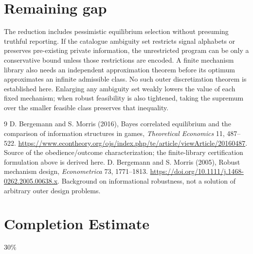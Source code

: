 \documentclass[11pt]{article}
\theoremstyle{definition}
\theoremstyle{remark}
\begin{document}
\section{Remaining gap}
The reduction includes pessimistic equilibrium selection without presuming truthful reporting. If the catalogue ambiguity set restricts signal alphabets or preserves pre-existing private information, the unrestricted program can be only a conservative bound unless those restrictions are encoded. A finite mechanism library also needs an independent approximation theorem before its optimum approximates an infinite admissible class. No such outer discretization theorem is established here. Enlarging any ambiguity set weakly lowers the value of each fixed mechanism; when robust feasibility is also tightened, taking the supremum over the smaller feasible class preserves that inequality.

\begin{thebibliography}{9}
 D. Bergemann and S. Morris (2016), Bayes correlated equilibrium and the comparison of information structures in games, \emph{Theoretical Economics} 11, 487--522. \url{https://www.econtheory.org/ojs/index.php/te/article/viewArticle/20160487}. Source of the obedience/outcome characterization; the finite-library certification formulation above is derived here.
 D. Bergemann and S. Morris (2005), Robust mechanism design, \emph{Econometrica} 73, 1771--1813. \url{https://doi.org/10.1111/j.1468-0262.2005.00638.x}. Background on informational robustness, not a solution of arbitrary outer design problems.
\end{thebibliography}
\section{Completion Estimate}
30\%
\end{document}
